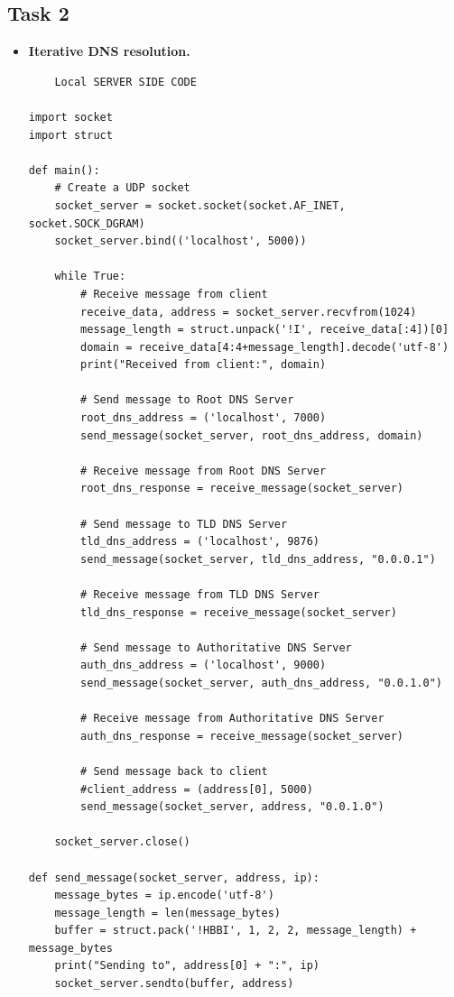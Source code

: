 \documentclass[11pt]{article}
\begin{document}
\subsection{Task 2}
\begin{itemize}
\item \textbf{Iterative DNS resolution.}
    \begin{verbatim}
    Local SERVER SIDE CODE
    
import socket
import struct

def main():
    # Create a UDP socket
    socket_server = socket.socket(socket.AF_INET, socket.SOCK_DGRAM)
    socket_server.bind(('localhost', 5000))

    while True:
        # Receive message from client
        receive_data, address = socket_server.recvfrom(1024)
        message_length = struct.unpack('!I', receive_data[:4])[0]
        domain = receive_data[4:4+message_length].decode('utf-8')
        print("Received from client:", domain)

        # Send message to Root DNS Server
        root_dns_address = ('localhost', 7000)
        send_message(socket_server, root_dns_address, domain)

        # Receive message from Root DNS Server
        root_dns_response = receive_message(socket_server)

        # Send message to TLD DNS Server
        tld_dns_address = ('localhost', 9876)
        send_message(socket_server, tld_dns_address, "0.0.0.1")

        # Receive message from TLD DNS Server
        tld_dns_response = receive_message(socket_server)

        # Send message to Authoritative DNS Server
        auth_dns_address = ('localhost', 9000)
        send_message(socket_server, auth_dns_address, "0.0.1.0")

        # Receive message from Authoritative DNS Server
        auth_dns_response = receive_message(socket_server)

        # Send message back to client
        #client_address = (address[0], 5000)
        send_message(socket_server, address, "0.0.1.0")

    socket_server.close()

def send_message(socket_server, address, ip):
    message_bytes = ip.encode('utf-8')
    message_length = len(message_bytes)
    buffer = struct.pack('!HBBI', 1, 2, 2, message_length) + message_bytes
    print("Sending to", address[0] + ":", ip)
    socket_server.sendto(buffer, address)


\end{verbatim}
\end{itemize}
\end{document}
